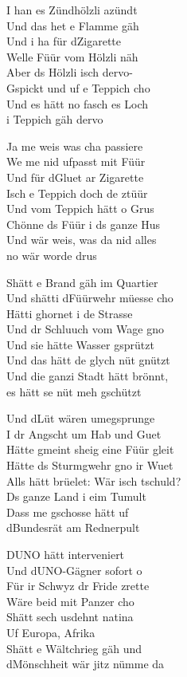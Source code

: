\documentclass[
  letterpaper,
  a5paper]{memoir}
\begin{document}
I han es Zündhölzli azündt\\
Und das het e Flamme gäh\\
Und i ha für d\textquotesingle Zigarette\\
Welle Füür vom Hölzli näh\\
Aber ds Hölzli isch dervo-\\
Gspickt und uf e Teppich cho\\
Und es hätt no fasch es Loch\\
i Teppich gäh dervo

Ja me weis was cha passiere\\
We me nid ufpasst mit Füür\\
Und für d\textquotesingle Gluet ar Zigarette\\
Isch e Teppich doch de z\textquotesingle tüür\\
Und vom Teppich hätt o Grus\\
Chönne ds Füür i ds ganze Hus\\
Und wär weis, was da nid alles\\
no wär worde drus

S\textquotesingle hätt e Brand gäh im Quartier\\
Und s\textquotesingle hätti d\textquotesingle Füürwehr müesse cho\\
Hätti ghornet i de Strasse\\
Und dr Schluuch vom Wage gno\\
Und sie hätte Wasser gsprützt\\
Und das hätt de glych nüt gnützt\\
Und die ganzi Stadt hätt brönnt,\\
es hätt se nüt meh gschützt

Und d\textquotesingle Lüt wären umegsprunge\\
I dr Angscht um Hab und Guet\\
Hätte gmeint s\textquotesingle heig eine Füür gleit\\
Hätte ds Sturmgwehr gno ir Wuet\\
Alls hätt brüelet: Wär isch tschuld?\\
Ds ganze Land i eim Tumult\\
Dass me gschosse hätt uf\\
d\textquotesingle Bundesrät am Rednerpult

D\textquotesingle UNO hätt interveniert\\
Und d\textquotesingle UNO-Gägner sofort o\\
Für ir Schwyz dr Fride z\textquotesingle rette\\
Wäre beid mit Panzer cho\\
S\textquotesingle hätt sech usdehnt natina\\
Uf Europa, Afrika\\
S\textquotesingle hätt e Wältchrieg gäh und\\
d\textquotesingle Mönschheit wär jitz nümme da
\end{document}
